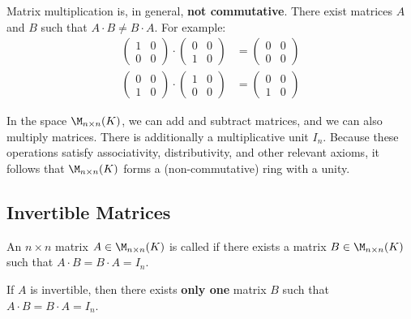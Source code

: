 \begin{importantremark}
Matrix multiplication is, in general, \textbf{not commutative}. There exist matrices $A$ and $B$ such that $A \cdot B \neq B \cdot A$. For example:
\begin{align*}
    \begin{pmatrix} 1 & 0 \\ 0 & 0 \end{pmatrix} \cdot \begin{pmatrix} 0 & 0 \\ 1 & 0 \end{pmatrix} &= \begin{pmatrix} 0 & 0 \\ 0 & 0 \end{pmatrix} \\
    \begin{pmatrix} 0 & 0 \\ 1 & 0 \end{pmatrix} \cdot \begin{pmatrix} 1 & 0 \\ 0 & 0 \end{pmatrix} &= \begin{pmatrix} 0 & 0 \\ 1 & 0 \end{pmatrix}
\end{align*}
\end{importantremark}

\begin{remark}
In the space $\M_{n \times n}(K)$, we can add and subtract matrices, and we can also multiply matrices. There is additionally a multiplicative unit $I_n$. Because these operations satisfy associativity, distributivity, and other relevant axioms, it follows that $\M_{n \times n}(K)$ forms a (non-commutative) ring with a unity.
\end{remark}

\subsection{Invertible Matrices}

\begin{definition}[Invertibility]
An $n \times n$ matrix $A \in \M_{n \times n}(K)$ is called  if there exists a matrix $B \in \M_{n \times n}(K)$ such that $A \cdot B = B \cdot A = I_n$.
\end{definition}

\begin{remark}
If $A$ is invertible, then there exists \textbf{only one} matrix $B$ such that $A \cdot B = B \cdot A = I_n$.
\end{remark}

